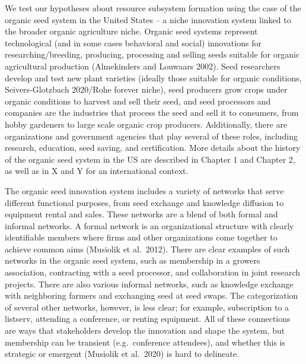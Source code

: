 \documentclass[twoside,12pt,final]{ucthesis-CA2012}
\begin{document}
\begin{ucmainmatter}
We test our hypotheses about resource subsystem formation using the case
of the organic seed system in the United States -- a niche innovation
system linked to the broader organic agriculture niche. Organic seed
systems represent technological (and in some cases behavioral and
social) innovations for researching/breeding, producing, processing and
selling seeds suitable for organic agricultural production (Almekinders
and Louwaars 2002). Seed researchers develop and test new plant
varieties (ideally those suitable for organic conditions,
Seivers-Glotzbach 2020/Rohe forever niche), seed producers grow crops
under organic conditions to harvest and sell their seed, and seed
processors and companies are the industries that process the seed and
sell it to consumers, from hobby gardeners to large scale organic crop
producers. Additionally, there are organizations and government agencies
that play several of these roles, including research, education, seed
saving, and certification. More details about the history of the organic
seed system in the US are described in Chapter 1 and Chapter 2, as well
as in X and Y for an international context.

The organic seed innovation system includes a variety of networks that
serve different functional purposes, from seed exchange and knowledge
diffusion to equipment rental and sales. These networks are a blend of
both formal and informal networks. A formal network is an
\textquotesingle organizational structure with clearly identifiable members where firms
and other organizations come together to achieve common aims\textquotesingle{} (Musiolik
et al.~2012). There are clear examples of such networks in the organic
seed system, such as membership in a grower\textquotesingle s association, contracting
with a seed processor, and collaboration in joint research projects.
There are also various informal networks, such as knowledge exchange
with neighboring farmers and exchanging seed at seed swaps. The
categorization of several other networks, however, is less clear; for
example, subscription to a listserv, attending a conference, or renting
equipment. All of these connections are ways that stakeholders develop
the innovation and shape the system, but membership can be transient
(e.g.~conference attendees), and whether this is strategic or emergent
(Musiolik et al.~2020) is hard to delineate.


\end{ucmainmatter}
\end{document}
